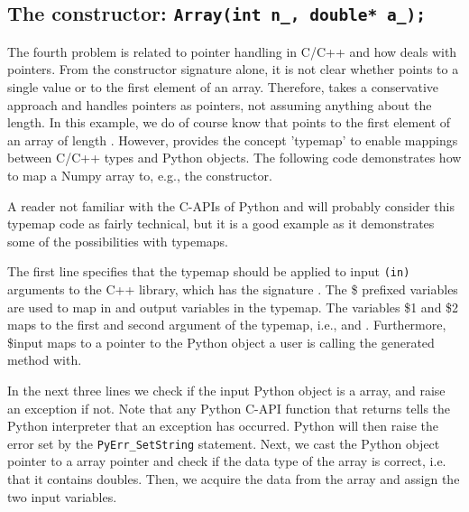 \begin{code}
\subsection{The constructor: \texttt{Array(int n\_, double* a\_);}}
The fourth problem is related to pointer handling in C/C++ and how \swig deals with pointers.  From the constructor signature alone, it is not clear whether  points to a single value or to the first element of an array. 
Therefore, \swig takes a conservative approach and handles pointers as pointers, not assuming anything about the length. 
In this example, we do of course know that 
 points to the first element of an array of length .  
However, \swig provides the concept 'typemap' to enable mappings between C/C++ types and Python objects. 
The following code demonstrates how to map a Numpy array
to, e.g., the  constructor. 
A reader not familiar with the C-APIs of Python and \numpy will probably consider this typemap code as fairly technical, but it is a good example as it demonstrates some of the possibilities with typemaps. \par
The first line specifies that the typemap should be applied to input \texttt{(in)} arguments to the C++ library, which has the signature . The \$ prefixed variables are used to map in and output variables in the typemap. The variables \$1 and \$2 maps to the first and second argument of the typemap, i.e.,  and . Furthermore, \$input maps to a pointer to the Python object a user is calling the \swig generated method with. \par
In the next three lines we check if the input Python object is a \numpy array, and raise an exception if not. 
Note that any Python C-API function that returns  tells the Python interpreter that an exception has occurred. Python will then raise the error set by the \texttt{PyErr\_SetString} statement. Next, we cast the Python object pointer to a \numpy array pointer and check if the data type of the \numpy array is correct, i.e. that it contains doubles. Then, we acquire the data from the \numpy array and assign the two input variables.\par


\end{code}
